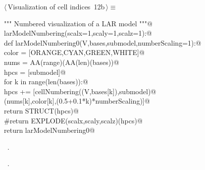 \documentclass[11pt,oneside]{article}	%
\begin{document}
\begin{flushleft} \small \label{scrap23}
\protect{}$\langle\,$Visualization of cell indices\nobreak\ {\footnotesize 12b}$\,\rangle\equiv$
\vspace{-1ex}
\begin{list}{}{} \item
\mbox{}\verb@""" Numbered visualization of a LAR model """@\\
\mbox{}\verb@def larModelNumbering(scalx=1,scaly=1,scalz=1):@\\
\mbox{}\verb@   def  larModelNumbering0(V,bases,submodel,numberScaling=1):@\\
\mbox{}\verb@      color = [ORANGE,CYAN,GREEN,WHITE]@\\
\mbox{}\verb@      nums = AA(range)(AA(len)(bases))@\\
\mbox{}\verb@      hpcs = [submodel]@\\
\mbox{}\verb@      for k in range(len(bases)):@\\
\mbox{}\verb@         hpcs += [cellNumbering((V,bases[k]),submodel)@\\
\mbox{}\verb@                  (nums[k],color[k],(0.5+0.1*k)*numberScaling)]@\\
\mbox{}\verb@      return STRUCT(hpcs)@\\
\mbox{}\verb@      #return EXPLODE(scalx,scaly,scalz)(hpcs)@\\
\mbox{}\verb@   return larModelNumbering0@\\
\mbox{}\verb@@{\NWsep}
\end{list}
\vspace{-1ex}
\footnotesize\addtolength{\baselineskip}{-1ex}
\begin{list}{}{\setlength{\itemsep}{-\parsep}\setlength{\itemindent}{-\leftmargin}}
\item \NWtxtMacroDefBy\ .
\item \NWtxtMacroRefIn\ .
\end{list}
\end{flushleft}
\end{document}
